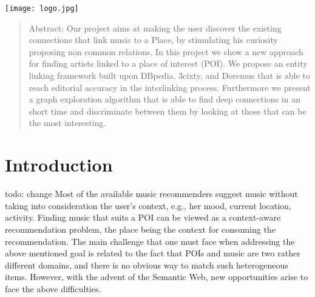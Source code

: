 \begin{titlepage}




\texttt{[image: logo.jpg]}\\ %
 

\vfill %

\end{titlepage}
\begin{abstract}
Abstract: 
Our project aims at making the user discover the existing connections that link music to a Place, by stimulating his curiosity proposing non common relations. In this project we show a new approach for finding artists linked to a place of interest (POI). We propose an entity linking framework built upon DBpedia, 3cixty, and Doremus that is able to reach editorial accuracy in the interlinking process. Furthermore we present a graph exploration algorithm that is able to find deep connections in an short time and discriminate between them by looking at those that can be the most interesting. 
\end{abstract}
\newpage

\tableofcontents
\newpage

\section{Introduction}
todo: change
Most of the available music recommenders suggest music without taking into consideration the user’s context, e.g., her mood, current location, activity. 
Finding music that suits a POI can be viewed as a context-aware recommendation problem, the place being the context for consuming the recommendation.         
The main challenge that one must face when addressing the above mentioned goal is related to the fact that POIs and music are two rather different domains, and there is no obvious way to match such heterogeneous items. However, with the advent of the Semantic Web,  new opportunities arise to face the above difficulties.   

